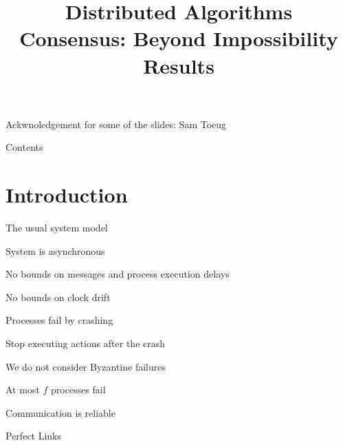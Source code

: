 \title[DS - FD \& Consensus]{\textbf{Distributed Algorithms}\\Consensus: Beyond Impossibility Results}





\newcommand{\Crashed}{\mathit{crashed}}
\newcommand{\Correct}{\mathit{correct}}
\newcommand{\Suspected}{\mathit{suspected}}
\newcommand{\Est}{\mathit{est}}
\newcommand{\Aux}{\mathit{aux}}
\newcommand{\Rec}{\mathit{rec}}
\newcommand{\Proc}{\mathit{proc}}
\newcommand{\Stop}{\mathit{stop}}

\newcommand{\SUSPECT}{\textsc{suspect}}
\newcommand{\PHASEA}{\textsc{phase1}}
\newcommand{\PHASEB}{\textsc{phase2}}
\newcommand{\DECIDE}{\textsc{decide}}
\newcommand{\REPORT}{\textsc{report}}
\newcommand{\PROPOSAL}{\textsc{proposal}}

\newcommand{\Random}{\fontproc{random}}

\begin{frame}
\titlepage

Ackwnoledgement for some of the slides: Sam Toeug



\end{frame}

\begin{frame}[shrink]{Contents}
\tableofcontents
\end{frame}



\section{Introduction}

\begin{frame}{The usual system model}
	
	
\BIL

\item \alert{System is asynchronous}
	\BI
	\item No bounds on messages and process execution delays
	\item No bounds on clock drift
	\EI
	
\item \alert{Processes fail by crashing}
	\BI
	\item Stop executing actions after the crash
	\item We do not consider Byzantine failures
	\item At most $f$ processes fail
	\EI

\item \alert{Communication is reliable}

	\BI
	\item Perfect Links
	\EI

\EIL

\end{frame}


